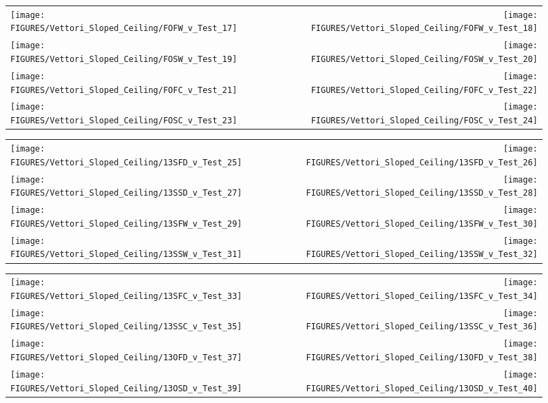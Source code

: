 \begin{figure}[p]
\begin{tabular*}{\textwidth}{l@{\extracolsep{\fill}}r}
\texttt{[image: FIGURES/Vettori\_Sloped\_Ceiling/FOFW\_v\_Test\_17]} &
\texttt{[image: FIGURES/Vettori\_Sloped\_Ceiling/FOFW\_v\_Test\_18]} \\
\texttt{[image: FIGURES/Vettori\_Sloped\_Ceiling/FOSW\_v\_Test\_19]} &
\texttt{[image: FIGURES/Vettori\_Sloped\_Ceiling/FOSW\_v\_Test\_20]} \\
\texttt{[image: FIGURES/Vettori\_Sloped\_Ceiling/FOFC\_v\_Test\_21]} &
\texttt{[image: FIGURES/Vettori\_Sloped\_Ceiling/FOFC\_v\_Test\_22]} \\
\texttt{[image: FIGURES/Vettori\_Sloped\_Ceiling/FOSC\_v\_Test\_23]} &
\texttt{[image: FIGURES/Vettori\_Sloped\_Ceiling/FOSC\_v\_Test\_24]} \\
\end{tabular*}
\label{Vettori_Sloped_3}
\end{figure}

\begin{figure}[p]
\begin{tabular*}{\textwidth}{l@{\extracolsep{\fill}}r}
\texttt{[image: FIGURES/Vettori\_Sloped\_Ceiling/13SFD\_v\_Test\_25]} &
\texttt{[image: FIGURES/Vettori\_Sloped\_Ceiling/13SFD\_v\_Test\_26]} \\
\texttt{[image: FIGURES/Vettori\_Sloped\_Ceiling/13SSD\_v\_Test\_27]} &
\texttt{[image: FIGURES/Vettori\_Sloped\_Ceiling/13SSD\_v\_Test\_28]} \\
\texttt{[image: FIGURES/Vettori\_Sloped\_Ceiling/13SFW\_v\_Test\_29]} &
\texttt{[image: FIGURES/Vettori\_Sloped\_Ceiling/13SFW\_v\_Test\_30]} \\
\texttt{[image: FIGURES/Vettori\_Sloped\_Ceiling/13SSW\_v\_Test\_31]} &
\texttt{[image: FIGURES/Vettori\_Sloped\_Ceiling/13SSW\_v\_Test\_32]} \\
\end{tabular*}
\label{Vettori_Sloped_4}
\end{figure}

\begin{figure}[p]
\begin{tabular*}{\textwidth}{l@{\extracolsep{\fill}}r}
\texttt{[image: FIGURES/Vettori\_Sloped\_Ceiling/13SFC\_v\_Test\_33]} &
\texttt{[image: FIGURES/Vettori\_Sloped\_Ceiling/13SFC\_v\_Test\_34]} \\
\texttt{[image: FIGURES/Vettori\_Sloped\_Ceiling/13SSC\_v\_Test\_35]} &
\texttt{[image: FIGURES/Vettori\_Sloped\_Ceiling/13SSC\_v\_Test\_36]} \\
\texttt{[image: FIGURES/Vettori\_Sloped\_Ceiling/13OFD\_v\_Test\_37]} &
\texttt{[image: FIGURES/Vettori\_Sloped\_Ceiling/13OFD\_v\_Test\_38]} \\
\texttt{[image: FIGURES/Vettori\_Sloped\_Ceiling/13OSD\_v\_Test\_39]} &
\texttt{[image: FIGURES/Vettori\_Sloped\_Ceiling/13OSD\_v\_Test\_40]} \\
\end{tabular*}
\label{Vettori_Sloped_5}
\end{figure}

